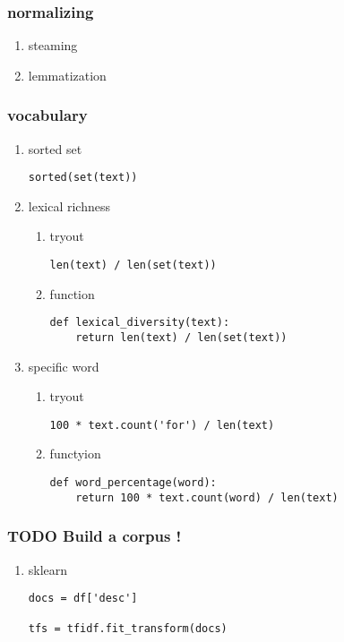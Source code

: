 \documentclass[11pt]{article}
\begin{document}
\subsubsection{normalizing}
\label{sec:orgbb0b3ab}
\begin{enumerate}
\item steaming
\label{sec:orgc59f17e}
\item lemmatization
\label{sec:org188e143}
\end{enumerate}
\subsubsection{vocabulary}
\label{sec:orgaf2d09a}
\begin{enumerate}
\item sorted set
\label{sec:orga50a113}
\begin{verbatim}
sorted(set(text))
\end{verbatim}
\item lexical richness
\label{sec:orge2266c6}
\begin{enumerate}
\item tryout
\label{sec:org6c83d74}
\begin{verbatim}
len(text) / len(set(text))
\end{verbatim}

\item function
\label{sec:org8f10f8c}
\begin{verbatim}
def lexical_diversity(text):
    return len(text) / len(set(text))
\end{verbatim}
\end{enumerate}
\item specific word
\label{sec:orgf69a6d4}
\begin{enumerate}
\item tryout
\label{sec:org0aa45a4}
\begin{verbatim}
100 * text.count('for') / len(text)
\end{verbatim}
\item functyion
\label{sec:org7f585d8}
\begin{verbatim}
def word_percentage(word):
    return 100 * text.count(word) / len(text)
\end{verbatim}
\end{enumerate}
\end{enumerate}

\subsubsection{{\bfseries\sffamily TODO} Build a corpus !}
\label{sec:orgc2e650f}

\begin{enumerate}
\item sklearn
\label{sec:org8dc0f77}
\begin{verbatim}
docs = df['desc']

tfs = tfidf.fit_transform(docs)
\end{verbatim}
\end{enumerate}
\end{document}

